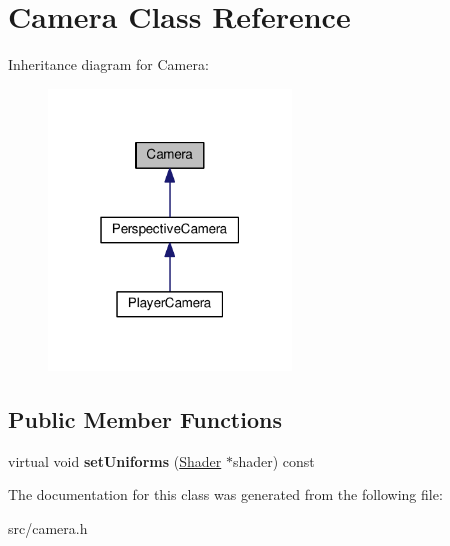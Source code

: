 \hypertarget{class_camera}{}\section{Camera Class Reference}
\label{class_camera}


Inheritance diagram for Camera\+:\nopagebreak
\begin{figure}[H]
\begin{center}
\leavevmode
\includegraphics[width=183pt]{class_camera__inherit__graph}
\end{center}
\end{figure}
\subsection*{Public Member Functions}
\begin{DoxyCompactItemize}
\item 
\hypertarget{class_camera_ab4a79b59eed20caf458908239df811ba}{}virtual void {\bfseries set\+Uniforms} (\hyperlink{class_shader}{Shader} $\ast$shader) const \label{class_camera_ab4a79b59eed20caf458908239df811ba}

\end{DoxyCompactItemize}


The documentation for this class was generated from the following file\+:\begin{DoxyCompactItemize}
\item 
src/camera.\+h\end{DoxyCompactItemize}
